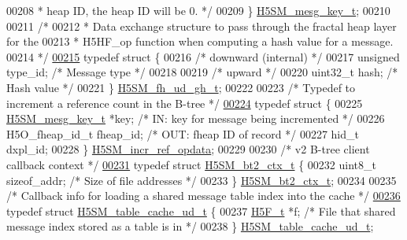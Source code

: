 \begin{DoxyCode}
00208 \textcolor{comment}{                                         * heap ID, the heap ID will be 0. */}
00209 \} \hyperlink{struct_h5_s_m__mesg__key__t}{H5SM\_mesg\_key\_t};
00210 
00211 \textcolor{comment}{/*}
00212 \textcolor{comment}{ * Data exchange structure to pass through the fractal heap layer for the}
00213 \textcolor{comment}{ * H5HF\_op function when computing a hash value for a message.}
00214 \textcolor{comment}{ */}
\hyperlink{struct_h5_s_m__fh__ud__gh__t}{00215} \textcolor{keyword}{typedef} \textcolor{keyword}{struct }\{
00216     \textcolor{comment}{/* downward (internal) */}
00217     \textcolor{keywordtype}{unsigned}    type\_id;                \textcolor{comment}{/* Message type */}
00218 
00219     \textcolor{comment}{/* upward */}
00220     uint32\_t    hash;                   \textcolor{comment}{/* Hash value */}
00221 \} \hyperlink{struct_h5_s_m__fh__ud__gh__t}{H5SM\_fh\_ud\_gh\_t};
00222 
00223 \textcolor{comment}{/* Typedef to increment a reference count in the B-tree */}
\hyperlink{struct_h5_s_m__incr__ref__opdata}{00224} \textcolor{keyword}{typedef} \textcolor{keyword}{struct }\{
00225     \hyperlink{struct_h5_s_m__mesg__key__t}{H5SM\_mesg\_key\_t} *key;       \textcolor{comment}{/* IN: key for message being incremented */}
00226     H5O\_fheap\_id\_t fheap\_id;    \textcolor{comment}{/* OUT: fheap ID of record */}
00227     hid\_t dxpl\_id;
00228 \} \hyperlink{struct_h5_s_m__incr__ref__opdata}{H5SM\_incr\_ref\_opdata};
00229 
00230 \textcolor{comment}{/* v2 B-tree client callback context */}
\hyperlink{struct_h5_s_m__bt2__ctx__t}{00231} \textcolor{keyword}{typedef} \textcolor{keyword}{struct }\hyperlink{struct_h5_s_m__bt2__ctx__t}{H5SM\_bt2\_ctx\_t} \{
00232     uint8\_t     sizeof\_addr;    \textcolor{comment}{/* Size of file addresses */}
00233 \} \hyperlink{struct_h5_s_m__bt2__ctx__t}{H5SM\_bt2\_ctx\_t};
00234 
00235 \textcolor{comment}{/* Callback info for loading a shared message table index into the cache */}
\hyperlink{struct_h5_s_m__table__cache__ud__t}{00236} \textcolor{keyword}{typedef} \textcolor{keyword}{struct }\hyperlink{struct_h5_s_m__table__cache__ud__t}{H5SM\_table\_cache\_ud\_t} \{
00237     \hyperlink{struct_h5_f__t}{H5F\_t} *f;                   \textcolor{comment}{/* File that shared message index stored as a table is in */}
00238 \} \hyperlink{struct_h5_s_m__table__cache__ud__t}{H5SM\_table\_cache\_ud\_t};

\end{DoxyCode}
